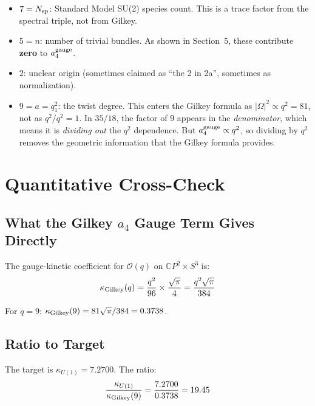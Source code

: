 \documentclass[12pt,a4paper]{article}
\theoremstyle{definition}
\begin{document}
\begin{itemize}
\item $7 = N_{\rm sp}$: Standard Model SU(2) species count.
  This is a trace factor from the spectral triple, not from Gilkey.
\item $5 = n$: number of trivial bundles.  As shown in Section~5,
  these contribute \textbf{zero} to $a_4^{\rm gauge}$.
\item $2$: unclear origin (sometimes claimed as ``the 2 in 2a'',
  sometimes as normalization).
\item $9 = a = q_1^2$: the twist degree.  This enters the Gilkey
  formula as $|\Omega|^2 \propto q^2 = 81$, not as $q^2/q^2 = 1$.
  In $35/18$, the factor of 9 appears in the \emph{denominator},
  which means it is \emph{dividing out} the $q^2$ dependence.
  But $a_4^{\rm gauge} \propto q^2$, so dividing by $q^2$ removes
  the geometric information that the Gilkey formula provides.
\end{itemize}

\section{Quantitative Cross-Check}
\label{sec:crosscheck}

\subsection{What the Gilkey $a_4$ Gauge Term Gives Directly}

The gauge-kinetic coefficient for $\mathcal{O}(q)$ on
$\mathbb{C}P^2 \times S^3$ is:
\begin{equation}
\kappa_{\rm Gilkey}(q)
= \frac{q^2}{96} \times \frac{\sqrt{\pi}}{4}
= \frac{q^2\sqrt{\pi}}{384}
\end{equation}

For $q = 9$: $\kappa_{\rm Gilkey}(9) = 81\sqrt{\pi}/384 = 0.3738$.

\subsection{Ratio to Target}

The target is $\kappa_{U(1)} = 7.2700$.  The ratio:
\begin{equation}
\frac{\kappa_{U(1)}}{\kappa_{\rm Gilkey}(9)}
= \frac{7.2700}{0.3738} = 19.45
\end{equation}
\end{document}
